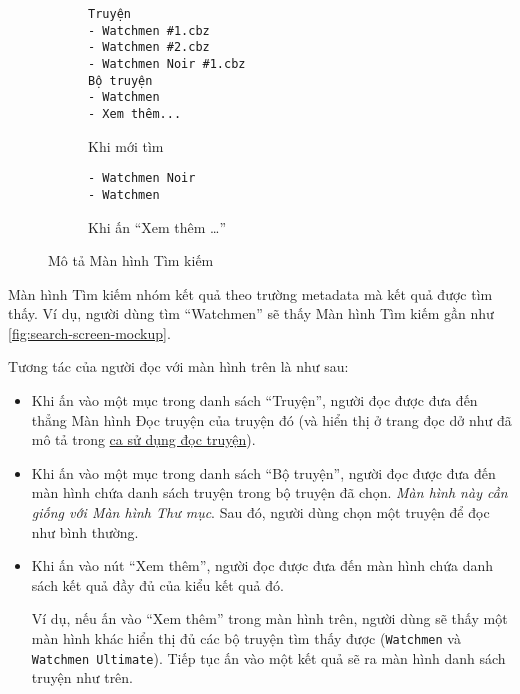 \documentclass[../../thesis]{subfiles}
\begin{document}
\begin{wrapfigure}[13]{r}{6.5cm}
\vspace*{-6mm}

\begin{subfigure}[b]{0.4\textwidth}
\begin{verbatim}
Truyện
- Watchmen #1.cbz
- Watchmen #2.cbz
- Watchmen Noir #1.cbz
Bộ truyện
- Watchmen
- Xem thêm...
\end{verbatim}

\vspace*{-3mm}
\caption{Khi mới tìm}
\end{subfigure}

\vspace*{6mm}

\begin{subfigure}[b]{0.4\textwidth}
\begin{verbatim}
- Watchmen Noir
- Watchmen
\end{verbatim}

\vspace*{-3mm}
\caption{Khi ấn ``Xem thêm \ldots''}
\end{subfigure}

\caption{Mô tả Màn hình Tìm kiếm}
\label{fig:search-screen-mockup}
\end{wrapfigure}

Màn hình Tìm kiếm nhóm kết quả theo trường metadata mà kết quả được tìm thấy. Ví
dụ, người dùng tìm ``Watchmen'' sẽ thấy Màn hình Tìm kiếm gần như
\autoref{fig:search-screen-mockup}.

Tương tác của người đọc với màn hình trên là như sau:

\begin{itemize}
    \item
        Khi ấn vào một mục trong danh sách ``Truyện'', người đọc được đưa đến
        thẳng Màn hình Đọc truyện của truyện đó (và hiển thị ở trang đọc dở như
        đã mô tả trong \hyperref[sec:read-comic]{ca sử dụng đọc truyện}).
    \item
        Khi ấn vào một mục trong danh sách ``Bộ truyện'', người đọc được đưa đến
        màn hình chứa danh sách truyện trong bộ truyện đã chọn. \emph{Màn hình
        này cần giống với Màn hình Thư mục}. Sau đó, người dùng chọn một truyện
        để đọc như bình thường.
\end{itemize}

\begin{itemize}[resume, before = \vspace*{-\dimexpr\topsep+\partopsep\relax}]
    \item
        Khi ấn vào nút ``Xem thêm'', người đọc được đưa đến màn hình chứa danh
        sách kết quả đầy đủ của kiểu kết quả đó.

        Ví dụ, nếu ấn vào ``Xem thêm'' trong màn hình trên, người dùng sẽ thấy
        một màn hình khác hiển thị đủ các bộ truyện tìm thấy được
        (\texttt{Watchmen} và \texttt{Watchmen Ultimate}). Tiếp tục ấn vào một
        kết quả sẽ ra màn hình danh sách truyện như trên.
\end{itemize}
\end{document}
